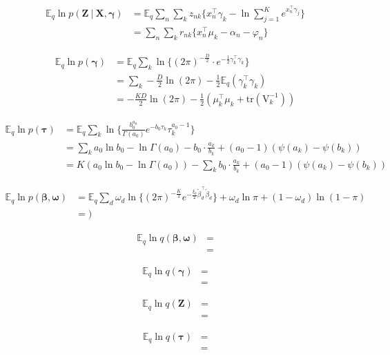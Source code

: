 \documentclass[twoside,11pt]{article}
\newcommand\given[1][]{\:#1\vert\:}
\newcommand{\transpose}[1]{#1^{\intercal}}
\newcommand{\nsum}{\sum\limits_{n}}
\newcommand{\ksum}{\sum\limits_{k}}
\newcommand{\boldbeta}{\boldsymbol\beta}
\newcommand{\boldgamma}{\boldsymbol\gamma}
\newcommand{\boldomega}{\boldsymbol\omega}
\newcommand{\boldtau}{\boldsymbol\tau}
\newcommand{\E}{\mathbb{E}}
\newcommand{\betad}{\tilde{\beta}_d}
\newcommand{\trace}[1]{\mathrm{tr} \left( #1 \right)}
\begin{document}
\begin{align*}
	\E_q \ln p\left( \mathbf{Z} \given \mathbf{X}, \boldgamma \right) &= \E_q \nsum \ksum z_{nk} \Big\{ \transpose{x_n} \gamma_k - \ln \sum_{j=1}^K e^{\transpose{x_n}\gamma_j}\Big\} \\
	&= \nsum \ksum r_{nk} \Big\{ \transpose{x_n} \mu_k - \alpha_n - \varphi_n \Big\}
\end{align*}

\begin{align*}
	\E_q \ln p\left( \boldgamma \right) &= \E_q \ksum  \ln \Big\{ (2\pi)^{-\frac{D}{2}} \cdot e^{-\frac{1}{2} \transpose{\gamma_k}\gamma_k}\Big\} \\
	&= \ksum - \frac{D}{2} \ln(2\pi) - \frac{1}{2} \E_q \left( \transpose{\gamma_k} \gamma_k \right) \\
	&= -\frac{KD}{2} \ln(2\pi) - \frac{1}{2} \left( \transpose{\mu_k} \mu_k + \trace{\mathrm{V}_k^{-1}} \right)
\end{align*}

\begin{align*}
	\E_q \ln p\left( \boldtau \right) &= \E_q \ksum \ln \Big\{ \frac{b_0^{a_0}}{\Gamma(a_0)} e^{-b_0 \tau_k} \tau_k^{a_0 - 1} \Big\} \\
	&= \ksum a_0 \ln b_0 - \ln \Gamma(a_0) - b_0 \cdot \frac{a_k}{b_k} + (a_0 - 1) \left( \psi(a_k) - \psi(b_k) \right) \\
	&= K \left( a_0 \ln b_0 - \ln \Gamma(a_0) \right) - \ksum b_0 \cdot \frac{a_k}{b_k} + (a_0 - 1) \left( \psi(a_k) - \psi(b_k) \right)
\end{align*}


\begin{align*}
	\E_q \ln p\left( \boldbeta, \boldomega \right) &= \E_q \sum_d \omega_d \ln \Big\{ (2\pi)^{-\frac{K}{2}} e^{-\frac{\xi_0}{2} \transpose{\betad} \betad}\Big\} + \omega_d \ln \pi + (1 - \omega_d) \ln \left( 1 - \pi \right) \\
	&= )
\end{align*}


\begin{align*}
	\E_q \ln q\left( \boldbeta, \boldomega \right) &= \\
	&= 
\end{align*}

\begin{align*}
	\E_q \ln q\left( \boldgamma \right) &= \\
	&= 
\end{align*}

\begin{align*}
	\E_q \ln q\left( \mathbf{Z} \right) &= \\
	&= 
\end{align*}

\begin{align*}
	\E_q \ln q\left( \boldtau \right) &= \\
	&= 
\end{align*}



\vskip 0.2in
\printbibliography
\end{document}
